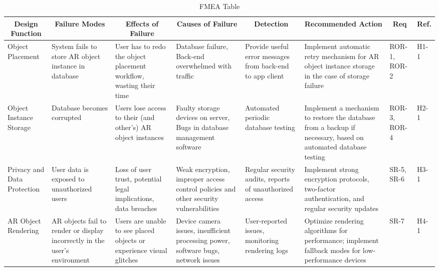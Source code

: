 \documentclass{article}
\begin{document}
\begin{landscape}
\begin{table}[hp]
    \caption{FMEA Table} \label{FMEA}
    \centering
    \begin{footnotesize}
    \begin{tabular}{|p{1in}|p{1in}|p{1.5in}|p{1.5in}|p{1.5in}|p{2in}|p{0.4in}|p{0.4in}|}
        \hline
        \multicolumn{1}{|c|}{\textbf{Design Function}} & \multicolumn{1}{c|}{\textbf{Failure Modes}} & \multicolumn{1}{c|}{\textbf{Effects of Failure}} & \multicolumn{1}{c|}{\textbf{Causes of Failure}} & \multicolumn{1}{|c|}{\textbf{Detection}} & \multicolumn{1}{c|}{\textbf{Recommended Action}} & \multicolumn{1}{c|}{\textbf{Req}} & \multicolumn{1}{c|}{\textbf{Ref.}} \\
        \hline
        Object Placement & System fails to store AR object instance in database & User has to redo the object placement workflow, wasting their time & Database failure, Back-end overwhelmed with traffic & Provide useful error messages from back-end to app client & Implement automatic retry mechanism for AR object instance storage in the case of storage failure & ROR-1, ROR-2 & H1-1\\
        \hline
        Object Instance Storage & Database becomes corrupted & Users lose access to their (and other's) AR object instances & Faulty storage devices on server, Bugs in database management software & Automated periodic database testing & Implement a mechanism to restore the database from a backup if necessary, based on automated database testing & ROR-3, ROR-4 & H2-1 \\
        \hline
        Privacy and Data Protection & User data is exposed to unauthorized users & Loss of user trust, potential legal implications, data breaches & Weak encryption, improper access control policies and other security vulnerabilities & Regular security audits, reports of unauthorized access & Implement strong encryption protocols, two-factor authentication, and regular security updates & SR-5, SR-6 & H3-1 \\
        \hline
        AR Object Rendering &  AR objects fail to render or display incorrectly in the user's environment & Users are unable to see placed objects or experience visual glitches & Device camera issues, insufficient processing power, software bugs, network issues & User-reported issues, monitoring rendering logs & Optimize rendering algorithms for performance; implement fallback modes for low-performance devices & SR-7 & H4-1 \\

\end{tabular}
\end{footnotesize}
\end{table}
\end{landscape}
\end{document}

